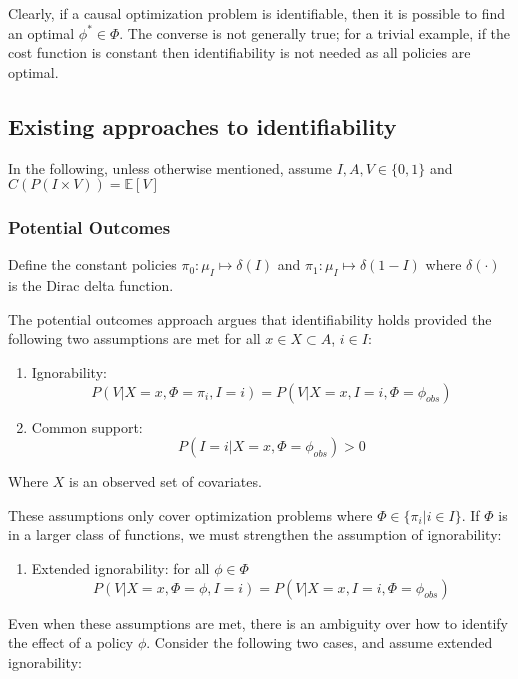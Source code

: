 Clearly, if a causal optimization problem is identifiable, then it is possible to find an optimal $\phi^*\in \Phi$. The converse is not generally true; for a trivial example, if the cost function is constant then identifiability is not needed as all policies are optimal.

\subsection{Existing approaches to identifiability}

In the following, unless otherwise mentioned, assume $I,A,V\in \{0,1\}$ and $C(P(I\times V)) = \mathbb{E}[V]$

\subsubsection{Potential Outcomes}

Define the constant policies $\pi_0:\mu_I\mapsto \delta(I)$ and $\pi_1:\mu_I\mapsto \delta(1-I)$ where $\delta(\cdot)$ is the Dirac delta function.

The potential outcomes approach argues that identifiability holds provided the following two assumptions are met for all $x\in X\subset A$, $i\in I$: \cite{rubin_causal_2005} \cite{sontag_causal_nodate}
\begin{enumerate}
    \item Ignorability: \[P(V|X=x,\Phi=\pi_i, I=i) = P(V|X=x,I=i,\Phi=\phi_{obs})\]
    \item Common support: \[P(I=i|X=x,\Phi=\phi_{obs})>0\]
\end{enumerate}
Where $X$ is an observed set of covariates.

These assumptions only cover optimization problems where $\Phi\in \{\pi_i|i\in I\}$. If $\Phi$ is in a larger class of functions, we must strengthen the assumption of ignorability:

\begin{enumerate}
    \item Extended ignorability: for all $\phi\in\Phi$ \[P(V|X=x,\Phi=\phi, I=i) = P(V|X=x,I=i,\Phi=\phi_{obs})\]
\end{enumerate}

Even when these assumptions are met, there is an ambiguity over how to identify the effect of a policy $\phi$. Consider the following two cases, and assume extended ignorability:

\begin{center}
\end{center}


